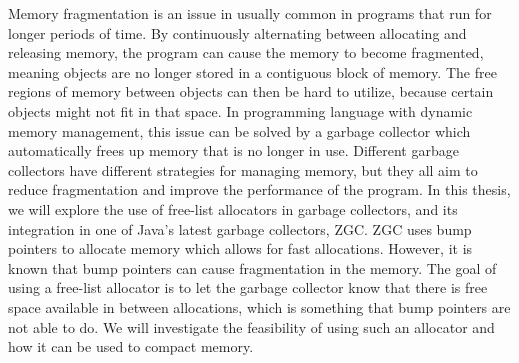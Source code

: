 
Memory fragmentation is an issue in usually common in programs that run for longer periods of time. By continuously alternating between allocating and releasing memory, the program can cause the memory to become fragmented, meaning objects are no longer stored in a contiguous block of memory. The free regions of memory between objects can then be hard to utilize, because certain objects might not fit in that space. In programming language with dynamic memory management, this issue can be solved by a garbage collector which automatically frees up memory that is no longer in use. Different garbage collectors have different strategies for managing memory, but they all aim to reduce fragmentation and improve the performance of the program. In this thesis, we will explore the use of free-list allocators in garbage collectors, and its integration in one of Java's latest garbage collectors, ZGC. ZGC uses bump pointers to allocate memory which allows for fast allocations. However, it is known that bump pointers can cause fragmentation in the memory. The goal of using a free-list allocator is to let the garbage collector know that there is free space available in between allocations, which is something that bump pointers are not able to do. We will investigate the feasibility of using such an allocator and how it can be used to compact memory.